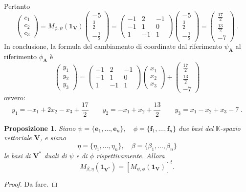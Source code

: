 \documentclass{article}
\theoremstyle{plain}
\newtheorem{prop}[thm]{Proposizione}
\theoremstyle{definition}
\theoremstyle{remark}
\begin{document}
Pertanto
\[
\begin{pmatrix}
c_1 \\
c_2 \\
c_3
\end{pmatrix}
= M_{\phi,\psi}(\mathbf{1_V})
\begin{pmatrix}
-5 \\
\frac{3}{2} \\
-\frac{1}{2}
\end{pmatrix}
=
\begin{pmatrix}
-1 & 2 & -1 \\
-1 & 1 & 0 \\
1 & -1 & 1
\end{pmatrix}
\begin{pmatrix}
-5 \\
\frac{3}{2} \\
-\frac{1}{2}
\end{pmatrix}
=
\begin{pmatrix}
\frac{17}{2} \\
\frac{13}{2} \\
-7
\end{pmatrix}\;.
\]
In conclusione, la formula del cambiamento di coordinate dal riferimento
$\psi_\mathbf{A}$ al riferimento $\phi_\mathbf{A}$ è
\[
\begin{pmatrix}
y_1 \\
y_2 \\
y_3
\end{pmatrix}
=
\begin{pmatrix}
-1 & 2 & -1 \\
-1 & 1 & 0 \\
1 & -1 & 1
\end{pmatrix}
\begin{pmatrix}
x_1 \\
x_2 \\
x_3
\end{pmatrix}
+
\begin{pmatrix}
\frac{17}{2} \\
\frac{13}{2} \\
-7
\end{pmatrix}
\]
ovvero:
\[
y_1 = -x_1 + 2x_2 - x_3 + \frac{17}{2} \quad\quad
y_2 = -x_1 + x_2 + \frac{13}{2} \quad\quad
y_3 = x_1 - x_2 + x_3 - 7\;.
\]

\vspace{10pt}

\begin{bxthm}
\begin{prop}
Siano \( \psi = \{\mathbf{e}_1, \dots, \mathbf{e}_n\}, \quad \phi = \{\mathbf{f}_1, \dots, \mathbf{f}_n\} \) 
due basi del \( \mathbb{K} \)-spazio vettoriale \( \mathbf{V} \), e siano
\[
\eta = \{\eta_1, \dots, \eta_n\}, \quad \beta = \{\beta_1, \dots, \beta_n\}
\]
le basi di \( \mathbf{V^*} \) duali di \( \psi \) e di \( \phi \) rispettivamente. Allora
\[
M_{\beta, \eta}(\mathbf{1_{V^*}}) = \left[ M_{\psi, \phi}(\mathbf{1_V}) \right]^t.
\]
\end{prop}
\end{bxthm}
\begin{proof}
    Da fare.
\end{proof}
\end{document}
